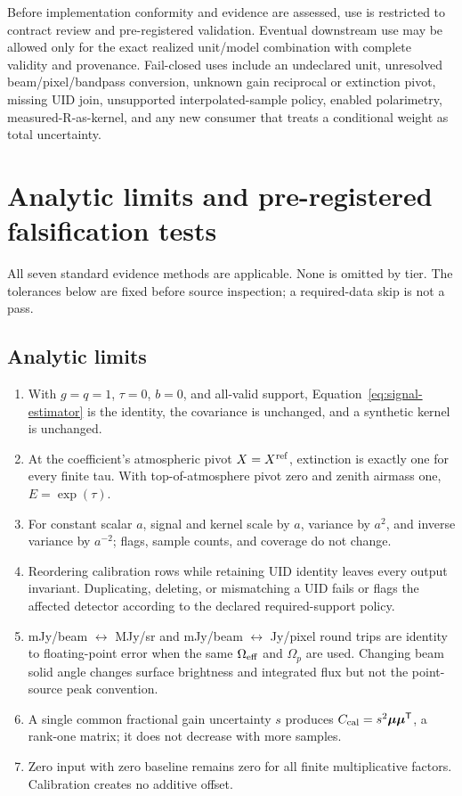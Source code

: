 \documentclass[11pt]{article}
\begin{document}
Before implementation conformity and evidence are assessed, use is restricted
to contract review and pre-registered validation.  Eventual downstream use may
be allowed only for the exact realized unit/model combination with complete
validity and provenance.  Fail-closed uses include an undeclared unit,
unresolved beam/pixel/bandpass conversion, unknown gain reciprocal or
extinction pivot, missing UID join, unsupported interpolated-sample policy,
enabled polarimetry, measured-R-as-kernel, and any new consumer that treats a
conditional weight as total uncertainty.

\section{Analytic limits and pre-registered falsification tests}

All seven standard evidence methods are applicable.  None is omitted by tier.
The tolerances below are fixed before source inspection; a required-data skip
is not a pass.

\subsection{Analytic limits}

\begin{enumerate}[label=CAL-A\arabic*,leftmargin=*]
\item With \(g=q=1\), \(\tau=0\), \(b=0\), and all-valid support,
Equation~\eqref{eq:signal-estimator} is the identity, the covariance is
unchanged, and a synthetic kernel is unchanged.
\item At the coefficient's atmospheric pivot \(X=X^{\rm ref}\), extinction is
exactly one for every finite tau.  With top-of-atmosphere pivot zero and zenith
airmass one, \(E=\exp(\tau)\).
\item For constant scalar \(a\), signal and kernel scale by \(a\), variance by
\(a^2\), and inverse variance by \(a^{-2}\); flags, sample counts, and coverage
do not change.
\item Reordering calibration rows while retaining UID identity leaves every
output invariant.  Duplicating, deleting, or mismatching a UID fails or flags
the affected detector according to the declared required-support policy.
\item mJy/beam \(\leftrightarrow\) MJy/sr and mJy/beam
\(\leftrightarrow\) Jy/pixel round trips are identity to floating-point error
when the same \(\Omega_{\rm eff}\) and \(\Omega_p\) are used.  Changing beam
solid angle changes surface brightness and integrated flux but not the
point-source peak convention.
\item A single common fractional gain uncertainty \(s\) produces
\(C_{\rm cal}=s^2\boldsymbol\mu\boldsymbol\mu^{\mathsf T}\), a rank-one matrix;
it does not decrease with more samples.
\item Zero input with zero baseline remains zero for all finite multiplicative
factors.  Calibration creates no additive offset.
\end{enumerate}
\end{document}
